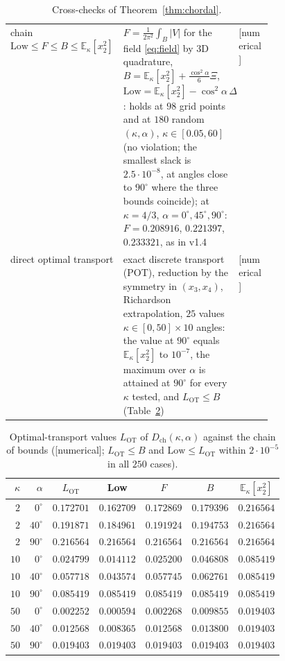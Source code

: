 \documentclass[11pt,a4paper]{article}
\theoremstyle{remark}
\theoremstyle{definition}
\theoremstyle{plain}
\theoremstyle{remark}
\newcommand{\E}{\mathbb{E}}
\newcommand{\st}[1]{\textsf{[#1]}}
\newcommand{\Dch}{D_{\mathrm{ch}}}
\begin{document}
\begin{table}[htbp]
\begin{tabularx}{\linewidth}{@{}>{\raggedright\arraybackslash}p{0.27\linewidth}>{\raggedright\arraybackslash}X>{\raggedright\arraybackslash}p{0.17\linewidth}@{}}
chain $\mathrm{Low}\le F\le B\le\E_\kappa[x_2^2]$ & $F=\frac1{2\pi^2}\int_B|V|$ for the field \eqref{eq:field} by $3$D quadrature, $B=\E_\kappa[x_2^2]+\frac{\cos^2\alpha}6\Xi$,
$\mathrm{Low}=\E_\kappa[x_2^2]-\cos^2\!\alpha\,\Delta$: holds at $98$ grid points and at $180$ random $(\kappa,\alpha)$, $\kappa\in[0.05,60]$ (no violation; the smallest slack is $2.5\cdot10^{-8}$, at angles close to $90^\circ$ where the three bounds coincide);
at $\kappa=4/3$, $\alpha=0^\circ,45^\circ,90^\circ$: $F=0.208916$, $0.221397$, $0.233321$, as in v1.4 & \st{numerical}\\
direct optimal transport & exact discrete transport (POT), reduction by the symmetry in $(x_3,x_4)$, Richardson extrapolation, $25$ values $\kappa\in[0,50]\times10$ angles: the value at $90^\circ$ equals $\E_\kappa[x_2^2]$ to $10^{-7}$,
the maximum over $\alpha$ is attained at $90^\circ$ for every $\kappa$ tested, and $L_{\mathrm{OT}}\le B$ (Table~\ref{tab:ot}) & \st{numerical}\\
\bottomrule
\end{tabularx}
\caption{Cross-checks of Theorem~\ref{thm:chordal}.}
\label{tab:cross}
\end{table}

\begin{table}[htbp]
\centering\small
\begin{tabular}{rrccccc}
\toprule
$\kappa$ & $\alpha$ & $L_{\mathrm{OT}}$ & Low & $F$ & $B$ & $\E_\kappa[x_2^2]$\\
\midrule
$2$ & $0^\circ$ & $0.172701$ & $0.162709$ & $0.172869$ & $0.179396$ & $0.216564$ \\
$2$ & $40^\circ$ & $0.191871$ & $0.184961$ & $0.191924$ & $0.194753$ & $0.216564$ \\
$2$ & $90^\circ$ & $0.216564$ & $0.216564$ & $0.216564$ & $0.216564$ & $0.216564$ \\
$10$ & $0^\circ$ & $0.024799$ & $0.014112$ & $0.025200$ & $0.046808$ & $0.085419$ \\
$10$ & $40^\circ$ & $0.057718$ & $0.043574$ & $0.057745$ & $0.062761$ & $0.085419$ \\
$10$ & $90^\circ$ & $0.085419$ & $0.085419$ & $0.085419$ & $0.085419$ & $0.085419$ \\
$50$ & $0^\circ$ & $0.002252$ & $0.000594$ & $0.002268$ & $0.009855$ & $0.019403$ \\
$50$ & $40^\circ$ & $0.012568$ & $0.008365$ & $0.012568$ & $0.013800$ & $0.019403$ \\
$50$ & $90^\circ$ & $0.019403$ & $0.019403$ & $0.019403$ & $0.019403$ & $0.019403$ \\
\bottomrule
\end{tabular}
\caption{Optimal-transport values $L_{\mathrm{OT}}$ of $\Dch(\kappa,\alpha)$ against the chain of bounds (\st{numerical}; $L_{\mathrm{OT}}\le B$ and $\mathrm{Low}\le L_{\mathrm{OT}}$ within $2\cdot10^{-5}$ in all $250$ cases).}
\label{tab:ot}
\end{table}
\end{document}
